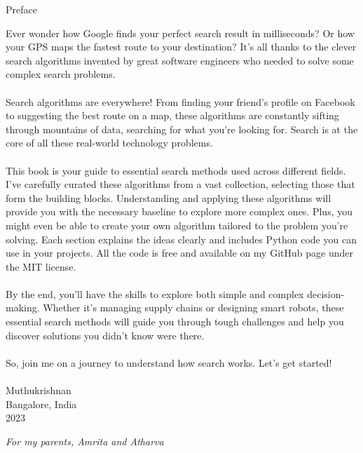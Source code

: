 \newpage


\begin{flushleft}
\Large Preface
\end{flushleft}

\vspace*{\baselineskip}
Ever wonder how Google finds your perfect search result in milliseconds? Or how your GPS maps the fastest route to your destination? It's all thanks to the clever search algorithms invented by great software engineers who needed to solve some complex search problems.
\\
\\
Search algorithms are everywhere! From finding your friend's profile on Facebook to suggesting the best route on a map, these algorithms are constantly sifting through mountains of data, searching for what you're looking for. Search is at the core of all these real-world technology problems.
\\
\\
This book is your guide to essential search methods used across different fields. I've carefully curated these algorithms from a vast collection, selecting those that form the building blocks. Understanding and applying these algorithms will provide you with the necessary baseline to explore more complex ones. Plus, you might even be able to create your own algorithm tailored to the problem you're solving. Each section explains the ideas clearly and includes Python code you can use in your projects. All the code is free and available on my GitHub page under the MIT license.
\\
\\
By the end, you'll have the skills to explore both simple and complex decision-making. Whether it's managing supply chains or designing smart robots, these essential search methods will guide you through tough challenges and help you discover solutions you didn't know were there.
\\
\\
So, join me on a journey to understand how search works. Let's get started!
\\
\\
Muthukrishnan\\
Bangalore, India\\
2023
\newpage



\vspace*{\baselineskip}
\vspace{20mm} %
\textit{For my parents, Amrita and Atharva}

\newpage